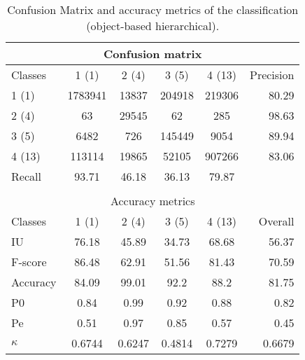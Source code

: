 \begin{table}[H]
\begin{center}
\footnotesize
\begin{tabular}{|l|c|c|c|c|r|}
\hline
\multicolumn{6}{|c|}{Confusion matrix} \\
\hline
 Classes & 1 (1) & 2 (4) & 3 (5) & 4 (13) & Precision \\
\hline
1 (1) & 1783941 & 13837 & 204918 & 219306 & 80.29 \\
\hline
2 (4) & 63 & 29545 & 62 & 285 & 98.63 \\
\hline
3 (5) & 6482 & 726 & 145449 & 9054 & 89.94 \\
\hline
4 (13) & 113114 & 19865 & 52105 & 907266 & 83.06 \\
\hline
Recall & 93.71 & 46.18 & 36.13 & 79.87 &  \\
\hline
\multicolumn{6}{c}{ } \\
\hline
\multicolumn{6}{|c|}{Accuracy metrics} \\
\hline
 Classes & 1 (1) & 2 (4) & 3 (5) & 4 (13) & Overall \\
\hline
IU & 76.18 & 45.89 & 34.73 & 68.68 & 56.37 \\
\hline
F-score & 86.48 & 62.91 & 51.56 & 81.43 & 70.59 \\
\hline
Accuracy & 84.09 & 99.01 & 92.2 & 88.2 & 81.75 \\
\hline
P0 & 0.84 & 0.99 & 0.92 & 0.88 & 0.82 \\
\hline
Pe & 0.51 & 0.97 & 0.85 & 0.57 & 0.45 \\
\hline
$\kappa$ & 0.6744 & 0.6247 & 0.4814 & 0.7279 & 0.6679 \\
\hline
\end{tabular}
\caption{Confusion Matrix and accuracy metrics of the classification (object-based hierarchical).}
\label{table:C3_S2_classif}
\end{center}
\end{table}